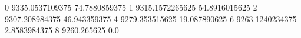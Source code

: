 0 9335.0537109375 74.7880859375
1 9315.1572265625 54.8916015625
2 9307.208984375 46.943359375
4 9279.353515625 19.087890625
6 9263.1240234375 2.8583984375
8 9260.265625 0.0
